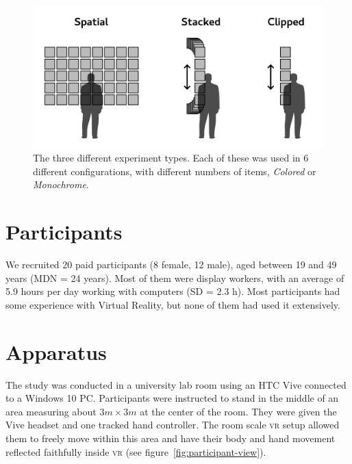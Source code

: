 \documentclass[nobib]{tufte-book} %
\begin{document}
\begin{figure}
  \includegraphics{types.png}
  \caption{The three different experiment types. Each of these was used in 6 different configurations, with different numbers of items, \emph{Colored} or \emph{Monochrome}.}
  \label{fig:experiment-types}
\end{figure}

\section{Participants}
We recruited 20 paid participants (8 female, 12 male), aged between 19 and 49 years (MDN = 24 years). Most of them were display workers, with an average of 5.9 hours per day working with computers (SD = 2.3 h). Most participants had some experience with Virtual Reality, but none of them had used it extensively.

\section{Apparatus}
The study was conducted in a university lab room using an HTC Vive connected to a Windows 10 PC. Participants were instructed to stand in the middle of an area measuring about $3m \times 3m$ at the center of the room. They were given the Vive headset and one tracked hand controller. The room scale \textsc{vr} setup allowed them to freely move within this area and have their body and hand movement reflected faithfully inside \textsc{vr} (see figure~\ref{fig:participant-view}).
\end{document}

